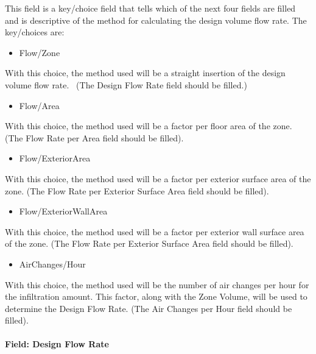 This field is a key/choice field that tells which of the next four fields are filled and is descriptive of the method for calculating the design volume flow rate. The key/choices are:

\begin{itemize}
\tightlist
\item
  Flow/Zone
\end{itemize}

With this choice, the method used will be a straight insertion of the design volume flow rate.~ (The Design Flow Rate field should be filled.)

\begin{itemize}
\tightlist
\item
  Flow/Area
\end{itemize}

With this choice, the method used will be a factor per floor area of the zone. (The Flow Rate per Area field should be filled).

\begin{itemize}
\tightlist
\item
  Flow/ExteriorArea
\end{itemize}

With this choice, the method used will be a factor per exterior surface area of the zone. (The Flow Rate per Exterior Surface Area field should be filled).

\begin{itemize}
\tightlist
\item
  Flow/ExteriorWallArea
\end{itemize}

With this choice, the method used will be a factor per exterior wall surface area of the zone. (The Flow Rate per Exterior Surface Area field should be filled).

\begin{itemize}
\tightlist
\item
  AirChanges/Hour
\end{itemize}

With this choice, the method used will be the number of air changes per hour for the infiltration amount. This factor, along with the Zone Volume, will be used to determine the Design Flow Rate. (The Air Changes per Hour field should be filled).

\paragraph{Field: Design Flow Rate}\label{field-design-flow-rate}

